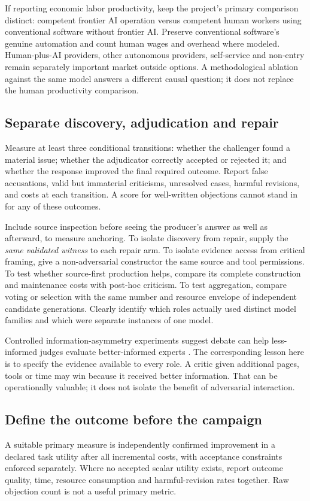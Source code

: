 If reporting economic labor productivity, keep the project's primary comparison distinct: competent frontier AI operation versus competent human workers using conventional software without frontier AI. Preserve conventional software's genuine automation and count human wages and overhead where modeled. Human-plus-AI providers, other autonomous providers, self-service and non-entry remain separately important market outside options. A methodological ablation against the same model answers a different causal question; it does not replace the human productivity comparison.

\subsection{Separate discovery, adjudication and repair}
Measure at least three conditional transitions: whether the challenger found a material issue; whether the adjudicator correctly accepted or rejected it; and whether the response improved the final required outcome. Report false accusations, valid but immaterial criticisms, unresolved cases, harmful revisions, and costs at each transition. A score for well-written objections cannot stand in for any of these outcomes.

Include source inspection before seeing the producer's answer as well as afterward, to measure anchoring. To isolate discovery from repair, supply the \emph{same validated witness} to each repair arm. To isolate evidence access from critical framing, give a non-adversarial constructor the same source and tool permissions. To test whether source-first production helps, compare its complete construction and maintenance costs with post-hoc criticism. To test aggregation, compare voting or selection with the same number and resource envelope of independent candidate generations. Clearly identify which roles actually used distinct model families and which were separate instances of one model.

Controlled information-asymmetry experiments suggest debate can help less-informed judges evaluate better-informed experts \citep{debate_truth}. The corresponding lesson here is to specify the evidence available to every role. A critic given additional pages, tools or time may win because it received better information. That can be operationally valuable; it does not isolate the benefit of adversarial interaction.

\subsection{Define the outcome before the campaign}
A suitable primary measure is independently confirmed improvement in a declared task utility after all incremental costs, with acceptance constraints enforced separately. Where no accepted scalar utility exists, report outcome quality, time, resource consumption and harmful-revision rates together. Raw objection count is not a useful primary metric.

